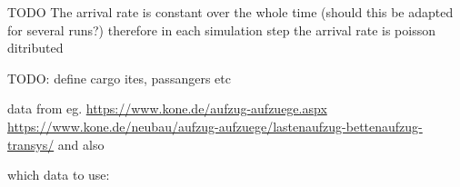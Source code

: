 \begingroup
\renewcommand*{\arraystretch}{1.0}
\begin{table}[]
\centering
{}
\caption{\label{tab:design:trafficitemprototypes} Prototypes for traffic items in the simulation}
\end{table}
\endgroup

TODO
The arrival rate is constant over the whole time (should this be adapted for several runs?)
therefore in each simulation step the arrival rate is poisson ditributed

TODO: define cargo ites, passangers etc

data from eg. \url{https://www.kone.de/aufzug-aufzuege.aspx} \url{https://www.kone.de/neubau/aufzug-aufzuege/lastenaufzug-bettenaufzug-transys/}
and also \autocite[][p.~349]{barney2016handbook}

which data to use: \autocite[][p.~347]{barney2016handbook}


